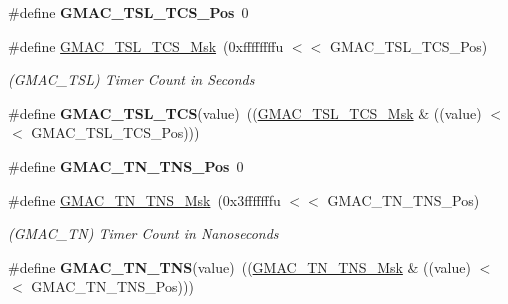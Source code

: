 \begin{DoxyCompactItemize}
\item 
\mbox{\label{group__SAME70__GMAC_gab12f603d5ac6c9ed0ac6510ea2d4b13b}} 
\#define {\bfseries G\+M\+A\+C\+\_\+\+T\+S\+L\+\_\+\+T\+C\+S\+\_\+\+Pos}~0
\item 
\mbox{\label{group__SAME70__GMAC_gaff2e3312410ca9417e313796f8dac27c}} 
\#define \mbox{\hyperlink{group__SAME70__GMAC_gaff2e3312410ca9417e313796f8dac27c}{G\+M\+A\+C\+\_\+\+T\+S\+L\+\_\+\+T\+C\+S\+\_\+\+Msk}}~(0xffffffffu $<$$<$ G\+M\+A\+C\+\_\+\+T\+S\+L\+\_\+\+T\+C\+S\+\_\+\+Pos)
\begin{DoxyCompactList}\small\item\em (G\+M\+A\+C\+\_\+\+T\+SL) Timer Count in Seconds \end{DoxyCompactList}\item 
\mbox{\label{group__SAME70__GMAC_ga24ee4b63250cc65b154199c602dfcf24}} 
\#define {\bfseries G\+M\+A\+C\+\_\+\+T\+S\+L\+\_\+\+T\+CS}(value)~((\mbox{\hyperlink{group__SAMV71__GMAC_gaff2e3312410ca9417e313796f8dac27c}{G\+M\+A\+C\+\_\+\+T\+S\+L\+\_\+\+T\+C\+S\+\_\+\+Msk}} \& ((value) $<$$<$ G\+M\+A\+C\+\_\+\+T\+S\+L\+\_\+\+T\+C\+S\+\_\+\+Pos)))
\item 
\mbox{\label{group__SAME70__GMAC_gaa4ac65ab0c9b8a1b09524daaf019cd99}} 
\#define {\bfseries G\+M\+A\+C\+\_\+\+T\+N\+\_\+\+T\+N\+S\+\_\+\+Pos}~0
\item 
\mbox{\label{group__SAME70__GMAC_ga82c2a88372db2dc5d5d700b63c0ec4fc}} 
\#define \mbox{\hyperlink{group__SAME70__GMAC_ga82c2a88372db2dc5d5d700b63c0ec4fc}{G\+M\+A\+C\+\_\+\+T\+N\+\_\+\+T\+N\+S\+\_\+\+Msk}}~(0x3fffffffu $<$$<$ G\+M\+A\+C\+\_\+\+T\+N\+\_\+\+T\+N\+S\+\_\+\+Pos)
\begin{DoxyCompactList}\small\item\em (G\+M\+A\+C\+\_\+\+TN) Timer Count in Nanoseconds \end{DoxyCompactList}\item 
\mbox{\label{group__SAME70__GMAC_gaaf9d36e9bf17c237f93a336255361d3a}} 
\#define {\bfseries G\+M\+A\+C\+\_\+\+T\+N\+\_\+\+T\+NS}(value)~((\mbox{\hyperlink{group__SAMV71__GMAC_ga82c2a88372db2dc5d5d700b63c0ec4fc}{G\+M\+A\+C\+\_\+\+T\+N\+\_\+\+T\+N\+S\+\_\+\+Msk}} \& ((value) $<$$<$ G\+M\+A\+C\+\_\+\+T\+N\+\_\+\+T\+N\+S\+\_\+\+Pos)))

\end{DoxyCompactItemize}
